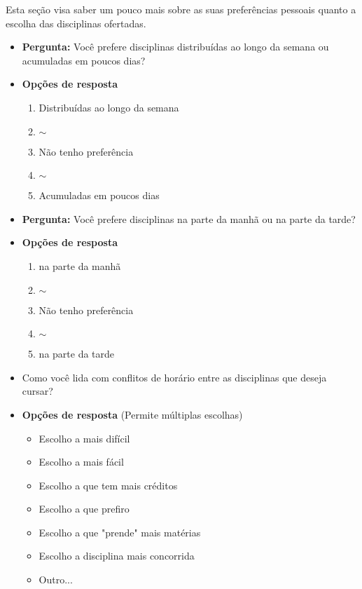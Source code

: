\begin{apendicesenv}
  Esta seção visa saber um pouco mais sobre as suas preferências pessoais quanto a escolha das disciplinas ofertadas.

  \begin{itemize}
    \item \textbf{Pergunta:} Você prefere disciplinas distribuídas ao longo da semana ou acumuladas em poucos dias?
    \item \textbf{Opções de resposta}
          \begin{enumerate}
            \item Distribuídas ao longo da semana
            \item $\sim$
            \item Não tenho preferência
            \item $\sim$
            \item Acumuladas em poucos dias
          \end{enumerate}
  \end{itemize}

  \begin{itemize}
    \item \textbf{Pergunta:} Você prefere disciplinas na parte da manhã ou na parte da tarde?
    \item \textbf{Opções de resposta}
          \begin{enumerate}
            \item na parte da manhã
            \item $\sim$
            \item Não tenho preferência
            \item $\sim$
            \item na parte da tarde
          \end{enumerate}
  \end{itemize}

  \begin{itemize}
    \item Como você lida com conflitos de horário entre as disciplinas que deseja cursar?
    \item \textbf{Opções de resposta} (Permite múltiplas escolhas)
          \begin{itemize}
            \item Escolho a mais difícil
            \item Escolho a mais fácil
            \item Escolho a que tem mais créditos
            \item Escolho a que prefiro
            \item Escolho a que "prende" mais matérias
            \item Escolho a disciplina mais concorrida
            \item Outro...
          \end{itemize}
  \end{itemize}


\end{apendicesenv}
